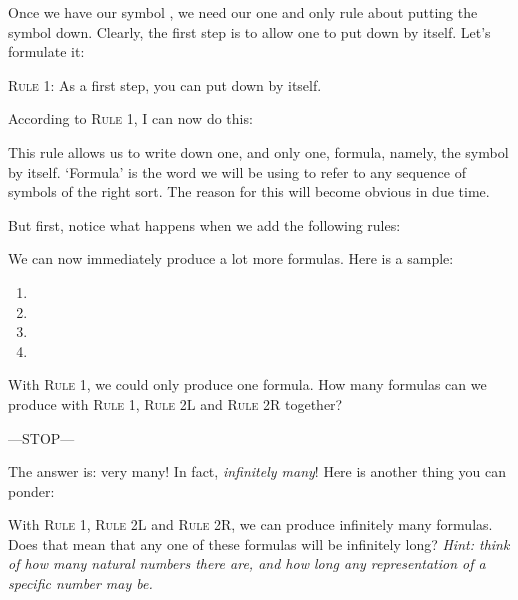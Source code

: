 Once we have our symbol \bcirc{}, we need our one and only rule about putting the symbol down. Clearly, the first step is to allow one to put down \bcirc{} by itself. Let's formulate it: 

\textsc{Rule 1:} As a first step, you can put down \bcirc{} by itself. 

According to \textsc{Rule 1}, I can now do this:

\begin{center}
	\bcirc{}
\end{center}

This rule allows us to write down one, and only one, formula, namely, the symbol \bcirc{} by itself. `Formula' is the word we will be using to refer to any sequence of symbols of the right sort. The reason for this will become obvious in due time. 

But first, notice what happens when we add the following rules:



We can now immediately produce a lot more formulas. Here is a sample: 

\begin{enumerate}
	\item \bcirc{}\bcirc{}
	\item \bcirc{}\bcirc{}\bcirc{}\bcirc{}\bcirc{}\bcirc{}
	\item \bcirc{}\bcirc{}\bcirc{}\bcirc{}
	\item \bcirc{}\bcirc{}\bcirc{}\bcirc{}\bcirc{}\bcirc{}\bcirc{}\bcirc{}
\end{enumerate}


\begin{exc}
With \textsc{Rule 1}, we could only produce one formula. How many formulas can we produce with \textsc{Rule 1}, \textsc{Rule 2L} and \textsc{Rule 2R} together?
\end{exc}

\begin{center}
	---STOP---
\end{center}

The answer is: very many! In fact, \textit{infinitely many}! Here is another thing you can ponder:

\begin{exc}
With \textsc{Rule 1}, \textsc{Rule 2L} and \textsc{Rule 2R}, we can produce infinitely many formulas. Does that mean that any one of these formulas will be infinitely long? \textit{Hint: think of how many natural numbers there are, and how long any representation of a specific number may be. }
\end{exc}


